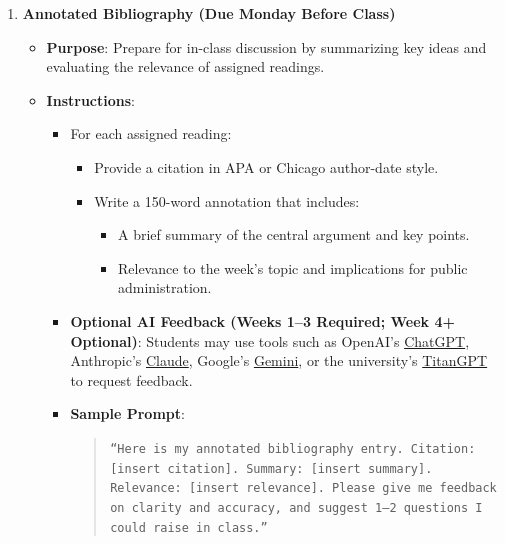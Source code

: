 \documentclass[12pt, letterpaper]{article}
\begin{document}
\begin{enumerate}
    \item \textbf{Annotated Bibliography (Due Monday Before Class)}
    \begin{itemize}
        \item \textbf{Purpose}: Prepare for in-class discussion by summarizing key ideas and evaluating the relevance of assigned readings.
        \item \textbf{Instructions}:
        \begin{itemize}
            \item For each assigned reading:
            \begin{itemize}
                \item Provide a citation in APA or Chicago author-date style.
                \item Write a 150-word annotation that includes:
                \begin{itemize}
                    \item A brief summary of the central argument and key points.
                    \item Relevance to the week's topic and implications for public administration.
                \end{itemize}
            \end{itemize}
            \item \textbf{Optional AI Feedback (Weeks 1--3 Required; Week 4+ Optional)}: Students may use tools such as OpenAI's \href{https://chat.openai.com/}{ChatGPT}, Anthropic's \href{https://www.anthropic.com/}{Claude}, Google's \href{https://www.google.com/search/about/}{Gemini}, or the university's \href{https://titangpt.fullerton.edu/auth/jwt/login}{TitanGPT} to request feedback.  
            \item \textbf{Sample Prompt}:
            \begin{quote}
                \texttt{``Here is my annotated bibliography entry. Citation: [insert citation]. Summary: [insert summary]. Relevance: [insert relevance]. Please give me feedback on clarity and accuracy, and suggest 1--2 questions I could raise in class.''}
            \end{quote}
        \end{itemize}
    \end{itemize}


\end{enumerate}
\end{document}
